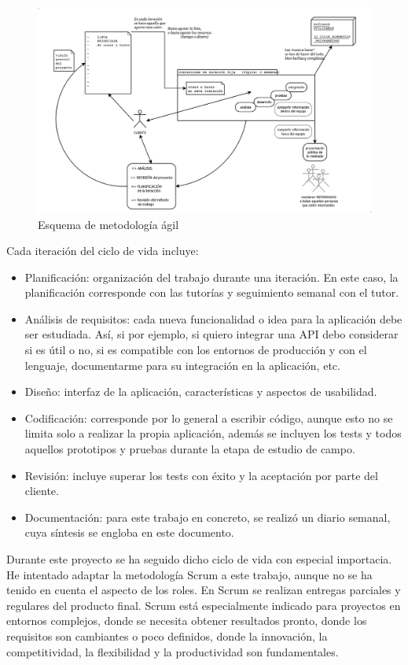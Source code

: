 \begin{figure}[H]
	\centering
	\includegraphics[width=14cm]{./images/metodologia-agil.png}
	\caption{Esquema de metodología ágil} \label{fig:metodologia}
\end{figure}

\vspace*{0.1in}
Cada iteración del ciclo de vida incluye:
\begin{itemize}
	\item Planificación: organización del trabajo durante una iteración. En este caso, la planificación corresponde con las tutorías y seguimiento semanal con el tutor.
	\item Análisis de requisitos: cada nueva funcionalidad o idea para la aplicación debe ser estudiada. Así, si por ejemplo, si quiero integrar una API debo considerar si es útil o no, si es compatible con los entornos de producción y con el lenguaje, documentarme para su integración en la aplicación, etc.
	\item Diseño: interfaz de la aplicación, características y aspectos de usabilidad.
	\item Codificación: corresponde por lo general a escribir código, aunque esto no se limita solo a realizar la propia aplicación, además se incluyen los tests y todos aquellos prototipos y pruebas durante la etapa de estudio de campo.
	\item Revisión: incluye superar los tests con éxito y la aceptación por parte del cliente.
	\item Documentación: para este trabajo en concreto, se realizó un diario semanal, cuya síntesis se engloba en este documento.
\end{itemize}

Durante este proyecto se ha seguido dicho ciclo de vida con especial importacia. He intentado adaptar la metodología Scrum a este trabajo, aunque no se ha tenido en cuenta  el aspecto de los roles. En Scrum se realizan entregas parciales y regulares del producto final. Scrum está especialmente indicado para proyectos en entornos complejos, donde se necesita obtener resultados pronto, donde los requisitos son cambiantes o poco definidos, donde la innovación, la competitividad, la flexibilidad y la productividad son fundamentales. \\

%



